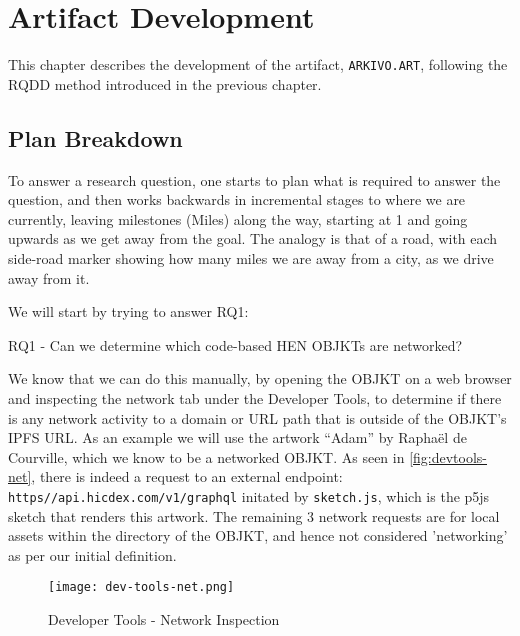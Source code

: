 \chapter{Artifact Development}

This chapter describes the development of the artifact, \texttt{ARKIVO.ART}, following the RQDD method introduced in the previous chapter.

\section{Plan Breakdown}

To answer a research question, one starts to plan what is required to answer the question, and then works backwards in incremental stages to where we are currently, leaving milestones (Miles) along the way, starting at 1 and going upwards as we get away from the goal. The analogy is that of a road, with each side-road marker showing how many miles we are away from a city, as we drive away from it.

We will start by trying to answer RQ1:

\vspace{0.5cm}

RQ1 - Can we determine which code-based HEN OBJKTs are networked?

\vspace{0.5cm}

We know that we can do this manually, by opening the OBJKT on a web browser and inspecting the network tab under the Developer Tools, to determine if there is any network activity to a domain or URL path that is outside of the OBJKT's IPFS URL. As an example we will use the artwork ``Adam'' by Raphaël de Courville\footnotemark[1], which we know to be a networked OBJKT.
As seen in \autoref{fig:devtools-net}, there is indeed a request to an external endpoint: \texttt{https\://api.hicdex.com/v1/graphql} initated by \texttt{sketch.js}, which is the p5js sketch that renders this artwork. The remaining 3 network requests are for local assets within the directory of the OBJKT, and hence not considered 'networking' as per our initial definition.


\begin{figure}[h]
    \centering
    \texttt{[image: dev-tools-net.png]}
    \caption[Developer Tools - Network Inspection]{Developer Tools - Network Inspection}
    \label{fig:devtools-net}
\end{figure}

